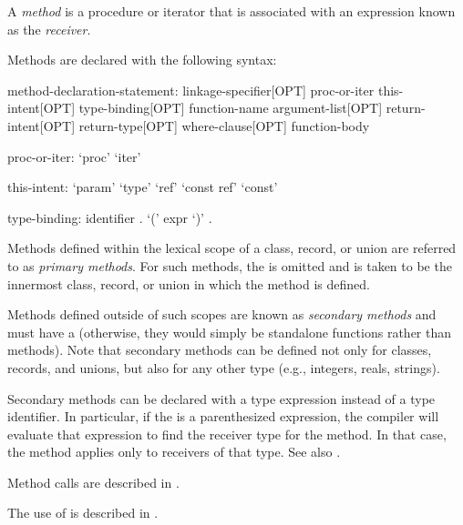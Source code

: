 \label{Methods}

A \emph{method} is a procedure or iterator that is associated with an
expression known as the \emph{receiver}.

Methods are declared with the following syntax:
\begin{syntax}
method-declaration-statement:
  linkage-specifier[OPT] proc-or-iter this-intent[OPT] type-binding[OPT] function-name argument-list[OPT] 
    return-intent[OPT] return-type[OPT] where-clause[OPT] function-body

proc-or-iter:
  `proc'
  `iter'

this-intent:
  `param'
  `type'
  `ref'
  `const ref'
  `const'

type-binding:
  identifier .
  `(' expr `)' .

\end{syntax}


Methods defined within the lexical scope of a class, record, or union
are referred to as \emph{primary methods}.  For such methods,
the  is omitted and is taken to be the
innermost class, record, or union in which the method is defined.

Methods defined outside of such scopes are known as \emph{secondary
methods} and must have a  (otherwise, they would
simply be standalone functions rather than methods).  Note that
secondary methods can be defined not only for classes, records, and
unions, but also for any other type (e.g., integers, reals, strings).

Secondary methods can be declared with a type expression instead of a
type identifier. In particular, if the  is a
parenthesized expression, the compiler will evaluate that expression to
find the receiver type for the method. In that case, the method applies
only to receivers of that type. See also
.

Method calls are described in .

The use of  is described in .

